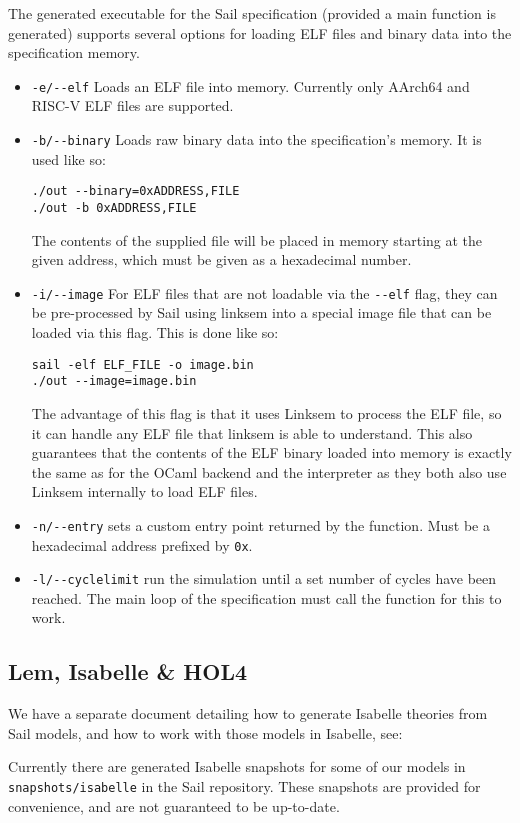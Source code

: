 The generated executable for the Sail specification (provided a main
function is generated) supports several options for loading ELF files
and binary data into the specification memory.
\begin{itemize}
\item \verb+-e/--elf+ Loads an ELF file into memory. Currently only
  AArch64 and RISC-V ELF files are supported.

\item \verb+-b/--binary+ Loads raw binary data into the
  specification's memory. It is used like so:
\begin{verbatim}
./out --binary=0xADDRESS,FILE
./out -b 0xADDRESS,FILE
\end{verbatim}
The contents of the supplied file will be placed in memory starting at
the given address, which must be given as a hexadecimal number.

\item \verb+-i/--image+ For ELF files that are not loadable via the
  \verb+--elf+ flag, they can be pre-processed by Sail using linksem
  into a special image file that can be loaded via this flag. This is
  done like so:
\begin{verbatim}
sail -elf ELF_FILE -o image.bin
./out --image=image.bin
\end{verbatim}
The advantage of this flag is that it uses Linksem to process the ELF
file, so it can handle any ELF file that linksem is able to
understand. This also guarantees that the contents of the ELF binary
loaded into memory is exactly the same as for the OCaml backend and
the interpreter as they both also use Linksem internally to load ELF
files.
\item \verb+-n/--entry+ sets a custom entry point returned by the
   function. Must be a hexadecimal address prefixed by
  \verb+0x+.
\item \verb+-l/--cyclelimit+ run the simulation until a set number of
  cycles have been reached. The main loop of the specification must
  call the  function for this to work.
\end{itemize}

\subsection{Lem, Isabelle \& HOL4}

We have a separate document detailing how to generate Isabelle
theories from Sail models, and how to work with those models in
Isabelle, see:
\begin{center}
\end{center}
Currently there are generated Isabelle snapshots for some of our
models in \verb+snapshots/isabelle+ in the Sail repository. These
snapshots are provided for convenience, and are not guaranteed to be
up-to-date.

